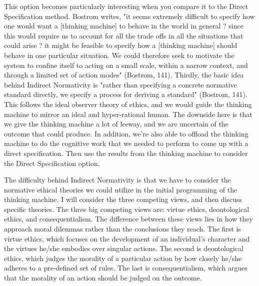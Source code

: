 \documentclass[11pt, oneside]{article}
\begin{document}
\par This option becomes particularly interesting when you compare it to the Direct Specification method. Bostrom writes, "it seems extremely difficult to specify how one would want a [thinking machine] to behave in the world in general ? since this would require us to account for all the trade offs in all the situations that could arise ? it might be feasible to specify how a [thinking machine] should behave in one particular situation. We could therefore seek to motivate the system to confine itself to acting on a small scale, within a narrow context, and through a limited set of action modes" (Bostrom, 141).
Thirdly, the basic idea behind Indirect Normativity is "rather than specifying a concrete normative standard directly, we specify a process for deriving a standard" (Bostrom, 141). This follows the ideal observer theory of ethics, and we would guide the thinking machine to mirror an ideal and hyper-rational human. The downside here is that we give the thinking machine a lot of leeway, and we are uncertain of the outcome that could produce. In addition, we're also able to offload the thinking machine to do the cognitive work that we needed to perform to come up with a direct specification. Then use the results from the thinking machine to consider the Direct Specification option.
 
\par The difficulty behind Indirect Normativity is that we have to consider the normative ethical theories we could utilize in the initial programming of the thinking machine. I will consider the three competing views, and then discuss specific theories. The three big competing views are: virtue ethics, deontological ethics, and consequentialism. The difference between these views lies in how they approach moral dilemmas rather than the conclusions they reach.
The first is virtue ethics, which focuses on the development of an individual's character and the virtues he/she embodies over singular actions. The second is deontological ethics, which judges the morality of a particular action by how closely he/she adheres to a pre-defined set of rules. The last is consequentialism, which argues that the morality of an action should be judged on the outcome.
 
\end{document}
